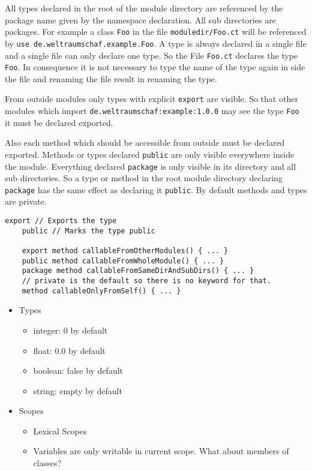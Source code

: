 \documentclass[11pt,a4paper]{report}
\begin{document}
All types declared in the root of the module directory are referenced by the package name given by the namespace declaration. All sub directories are packages. For example a class \texttt{Foo} in the file \texttt{moduledir/Foo.ct} will be referenced by \texttt{use de.weltraumschaf.example.Foo}. A type is always declared in a single file and a single file can only declare one type. So the File \texttt{Foo.ct} declares the type \texttt{Foo}. In consequence it is not necessary to type the name of the type again in side the file and renaming the file result in renaming the type.

From outside modules only types with explicit \texttt{export} are visible. So that other modules which import \texttt{de.weltraumschaf:example:1.0.0} may see the type \texttt{Foo} it must be declared exported.

Also each method which should be accessible from outside must be declared exported. Methods or types declared \texttt{public} are only visible everywhere inside the module. Everything declared \texttt{package} is only visible in its directory and all sub directories. So a type or method in the root module directory declaring \texttt{package} has the same effect as declaring it \texttt{public}. By default methods and types are private.

\begin{lstlisting}[language=CayThe]
    export // Exports the type
    public // Marks the type public

    export method callableFromOtherModules() { ... }
    public method callableFromWholeModule() { ... }
    package method callableFromSameDirAndSubDirs() { ... }
    // private is the default so there is no keyword for that.
    method callableOnlyFromSelf() { ... }
\end{lstlisting}


\begin{itemize}
    \item Types
    \begin{itemize}
        \item integer: 0 by default
        \item float: 0.0 by default
        \item boolean: false by default
        \item string: empty by default
    \end{itemize} 
    \item Scopes
    \begin{itemize}
        \item Lexical Scopes
        \item Variables are only writable in current scope. What about members of classes?
    \end{itemize}
\end{itemize}
\end{document}
